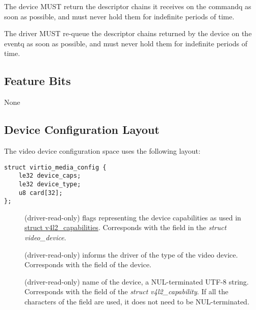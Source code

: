 
The device MUST return the descriptor chains it receives on the commandq as
soon as possible, and must never hold them for indefinite periods of time.


The driver MUST re-queue the descriptor chains returned by the device on the
eventq as soon as possible, and must never hold them for indefinite periods
of time.

\subsection{Feature Bits}\label{sec:Device Types / Media Device / Feature Bits}

None

\subsection{Device Configuration Layout}\label{sec:Device Types / Media Device / Device Configuration Layout}

The video device configuration space uses the following layout:

\begin{lstlisting}
struct virtio_media_config {
    le32 device_caps;
    le32 device_type;
    u8 card[32];
};
\end{lstlisting}

\begin{description}
\item[] (driver-read-only) flags representing the device
capabilities as used in
\href{https://www.kernel.org/doc/html/v4.9/media/uapi/v4l/vidioc-querycap.html#c.v4l2_capability}{struct v4l2_capabilities}.
Corresponds with the  field in the \textit{struct video_device}.
\item[] (driver-read-only) informs the driver of the type
of the video device. Corresponds with the  field of the device.
\item[] (driver-read-only) name of the device, a NUL-terminated
UTF-8 string. Corresponds with the  field of the \textit{struct v4l2_capability}.
If all the characters of the field are used, it does not need to be NUL-terminated.
\end{description}

